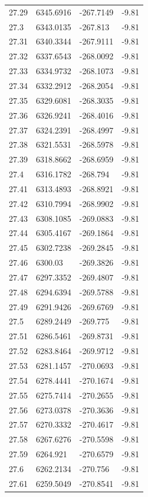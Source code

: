 \begin{table}[H]
\begin{tabular}{llll}
27.29 & 6345.6916 & -267.7149 & -9.81 \\
27.3 & 6343.0135 & -267.813 & -9.81 \\
27.31 & 6340.3344 & -267.9111 & -9.81 \\
27.32 & 6337.6543 & -268.0092 & -9.81 \\
27.33 & 6334.9732 & -268.1073 & -9.81 \\
27.34 & 6332.2912 & -268.2054 & -9.81 \\
27.35 & 6329.6081 & -268.3035 & -9.81 \\
27.36 & 6326.9241 & -268.4016 & -9.81 \\
27.37 & 6324.2391 & -268.4997 & -9.81 \\
27.38 & 6321.5531 & -268.5978 & -9.81 \\
27.39 & 6318.8662 & -268.6959 & -9.81 \\
27.4 & 6316.1782 & -268.794 & -9.81 \\
27.41 & 6313.4893 & -268.8921 & -9.81 \\
27.42 & 6310.7994 & -268.9902 & -9.81 \\
27.43 & 6308.1085 & -269.0883 & -9.81 \\
27.44 & 6305.4167 & -269.1864 & -9.81 \\
27.45 & 6302.7238 & -269.2845 & -9.81 \\
27.46 & 6300.03 & -269.3826 & -9.81 \\
27.47 & 6297.3352 & -269.4807 & -9.81 \\
27.48 & 6294.6394 & -269.5788 & -9.81 \\
27.49 & 6291.9426 & -269.6769 & -9.81 \\
27.5 & 6289.2449 & -269.775 & -9.81 \\
27.51 & 6286.5461 & -269.8731 & -9.81 \\
27.52 & 6283.8464 & -269.9712 & -9.81 \\
27.53 & 6281.1457 & -270.0693 & -9.81 \\
27.54 & 6278.4441 & -270.1674 & -9.81 \\
27.55 & 6275.7414 & -270.2655 & -9.81 \\
27.56 & 6273.0378 & -270.3636 & -9.81 \\
27.57 & 6270.3332 & -270.4617 & -9.81 \\
27.58 & 6267.6276 & -270.5598 & -9.81 \\
27.59 & 6264.921 & -270.6579 & -9.81 \\
27.6 & 6262.2134 & -270.756 & -9.81 \\
27.61 & 6259.5049 & -270.8541 & -9.81 \\

\end{tabular}
\end{table}
